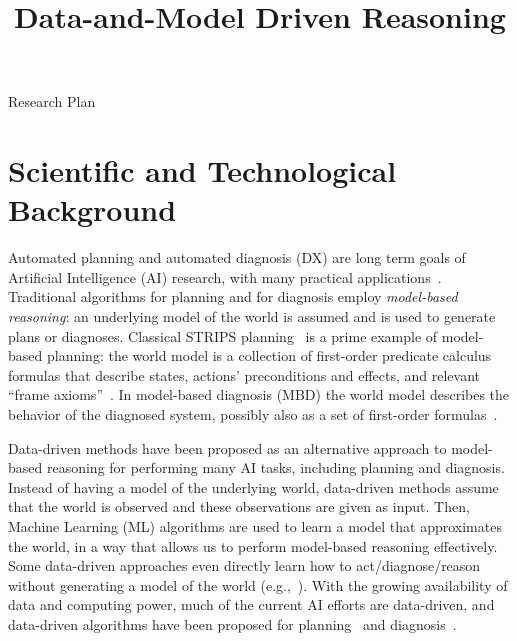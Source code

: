 \documentclass[12pt]{article}
\newcommand{\note}[1]{\textbf{\textit{#1}}}
\begin{document}
\title{Data-and-Model Driven Reasoning}

\begin{center}
\LARGE{Research Plan}
\end{center}

\section{Scientific and Technological Background}


Automated planning and automated diagnosis (DX) are long term goals of Artificial Intelligence (AI) research, with many practical applications~\cite{williams96,niggemann10model,abreu2011simultaneousDebugging,Zamir2014UsingMD,abreu2011simultaneousDebugging,ruml2011line,fox2011automatic,robinson2014cost}. Traditional algorithms for planning and for diagnosis employ {\em model-based reasoning}: an underlying model of the world is assumed and is used to generate plans or diagnoses. Classical STRIPS planning~\cite{fikes1971strips} is a prime example of model-based planning: the world model is a collection of first-order predicate calculus formulas that describe states, actions' preconditions and effects, and relevant ``frame axioms''~\cite{ghallab2004automated}. In model-based diagnosis (MBD) the world model describes the behavior of the diagnosed system, 
possibly also as a set of first-order formulas~\cite{reiter1987theory,deKleer1987diagnosing}. 



Data-driven methods have been proposed as an alternative approach to model-based reasoning for performing many AI tasks, including planning and diagnosis. Instead of having a model of the underlying world, data-driven methods  assume that the world is observed and these observations are given as input. Then, Machine Learning (ML) algorithms are used to learn a model that approximates the world, in a way that allows us to perform model-based reasoning effectively. Some data-driven approaches even directly learn how to act/diagnose/reason without generating a model of the world (e.g.,~\cite{kearns2002POMDPsample}). 
With the growing availability of data and computing power, much of the current AI efforts are data-driven,
and data-driven algorithms have been proposed for  planning~\cite{fern2011first,juba2016jmlr} and diagnosis~\cite{keren2011model,qin2012survey}.
\end{document}
